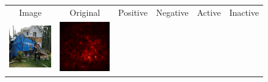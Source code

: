 \documentclass[preprint,12pt]{elsarticle}
\begin{document}
\begin{figure}[ht]
  \centering
  \footnotesize
  \newcommand{\scale}{0.35}
  \setlength{\tabcolsep}{2pt}
  \begin{tabular}{cccccc}
  Image & Original & Positive & Negative & Active & Inactive \\
  
  \includegraphics[scale=\scale]{../visualizations/examples/imagenette/resnet18/images/1.png} &
  \includegraphics[scale=\scale]{../visualizations/examples/imagenette/resnet18/saliency_map/1.png} & 

\end{tabular}
\end{figure}
\end{document}
